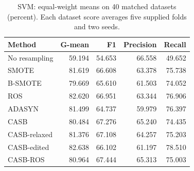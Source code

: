 \begin{table}[pos=!htbp]
\centering\small
\caption{SVM: equal-weight means on 40 matched datasets (percent). Each dataset score averages five supplied folds and two seeds.}\label{tab:scores_svm}
\begin{tabular}{lrrrr}\toprule
Method & G-mean & F1 & Precision & Recall \\
\midrule
No resampling & 59.194 & 54.653 & 66.558 & 49.652 \\
SMOTE & 81.619 & 66.608 & 63.378 & 75.738 \\
B-SMOTE & 79.669 & 65.610 & 61.503 & 74.052 \\
ROS & 82.620 & 66.951 & 63.344 & 76.906 \\
ADASYN & 81.499 & 64.737 & 59.979 & 76.397 \\
CASB & 80.484 & 67.276 & 65.240 & 74.435 \\
CASB-relaxed & 81.376 & 67.108 & 64.257 & 75.203 \\
CASB-edited & 82.638 & 66.102 & 61.197 & 78.510 \\
CASB-ROS & 80.964 & 67.444 & 65.313 & 75.003 \\
\bottomrule\end{tabular}
\end{table}

